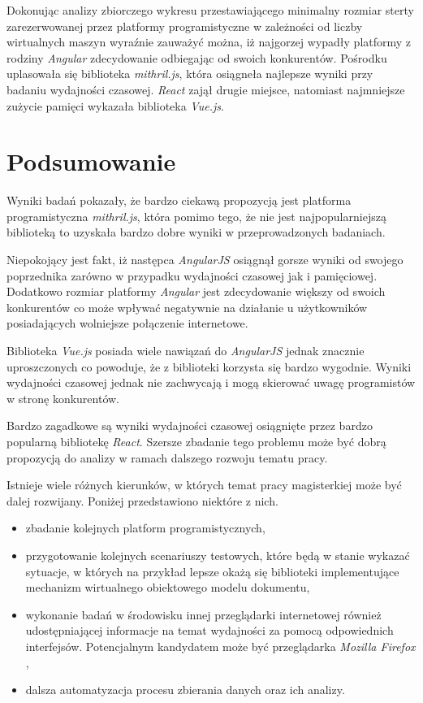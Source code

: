 \documentclass[polish, twoside, 12pt]{mwart}
\let\stdsection\section
\renewcommand*{\section}{\clearpage\stdsection}
\begin{document}
Dokonując analizy zbiorczego wykresu przestawiającego minimalny rozmiar sterty zarezerwowanej przez platformy programistyczne w zależności od liczby wirtualnych maszyn wyraźnie zauważyć można, iż najgorzej wypadły platformy z rodziny \emph{Angular} zdecydowanie odbiegając od swoich konkurentów. Pośrodku uplasowała się biblioteka \emph{mithril.js}, która osiągneła najlepsze wyniki przy badaniu wydajności czasowej. \emph{React} zajął drugie miejsce, natomiast najmniejsze zużycie pamięci wykazała biblioteka \emph{Vue.js}.

\section{Podsumowanie}

Wyniki badań pokazały, że bardzo ciekawą propozycją jest platforma programistyczna \emph{mithril.js}, która pomimo tego, że nie jest najpopularniejszą biblioteką to uzyskała bardzo dobre wyniki w przeprowadzonych badaniach. 

Niepokojący jest fakt, iż następca \emph{AngularJS} osiągnął gorsze wyniki od swojego poprzednika zarówno w przypadku wydajności czasowej jak i pamięciowej. Dodatkowo rozmiar platformy \emph{Angular} jest zdecydowanie większy od swoich konkurentów co może wpływać negatywnie na działanie u użytkowników posiadających wolniejsze połączenie internetowe.

Biblioteka \emph{Vue.js} posiada wiele nawiązań do \emph{AngularJS} jednak znacznie uproszczonych co powoduje, że z biblioteki korzysta się bardzo wygodnie. Wyniki wydajności czasowej jednak nie zachwycają i mogą skierować uwagę programistów w stronę konkurentów.

Bardzo zagadkowe są wyniki wydajności czasowej osiągnięte przez bardzo popularną bibliotekę \emph{React}. Szersze zbadanie tego problemu może być dobrą propozycją do analizy w ramach dalszego rozwoju tematu pracy.

Istnieje wiele różnych kierunków, w których temat pracy magisterkiej może być dalej rozwijany. Poniżej przedstawiono niektóre z nich.

\begin{itemize}
  \item zbadanie kolejnych platform programistycznych,
  \item przygotowanie kolejnych scenariuszy testowych, które będą w stanie wykazać sytuacje, w których na przykład lepsze okażą się biblioteki implementujące mechanizm wirtualnego obiektowego modelu dokumentu,
  \item wykonanie badań w środowisku innej przeglądarki internetowej również udostępniającej informacje na temat wydajności za pomocą odpowiednich interfejsów. Potencjalnym kandydatem może być przeglądarka \emph{Mozilla Firefox} \cite{firefox},
  \item dalsza automatyzacja procesu zbierania danych oraz ich analizy.
\end{itemize}
\end{document}
